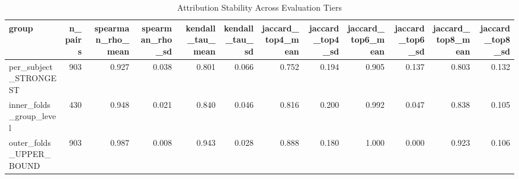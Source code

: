 \begin{table}
\caption{Attribution Stability Across Evaluation Tiers}
\label{tab:stability}
\begin{tabular}{lrrrrrrrrrrr}
\toprule
group & n_pairs & spearman_rho_mean & spearman_rho_sd & kendall_tau_mean & kendall_tau_sd & jaccard_top4_mean & jaccard_top4_sd & jaccard_top6_mean & jaccard_top6_sd & jaccard_top8_mean & jaccard_top8_sd \\
\midrule
per_subject_STRONGEST & 903 & 0.927 & 0.038 & 0.801 & 0.066 & 0.752 & 0.194 & 0.905 & 0.137 & 0.803 & 0.132 \\
inner_folds_group_level & 430 & 0.948 & 0.021 & 0.840 & 0.046 & 0.816 & 0.200 & 0.992 & 0.047 & 0.838 & 0.105 \\
outer_folds_UPPER_BOUND & 903 & 0.987 & 0.008 & 0.943 & 0.028 & 0.888 & 0.180 & 1.000 & 0.000 & 0.923 & 0.106 \\
\bottomrule
\end{tabular}
\end{table}

